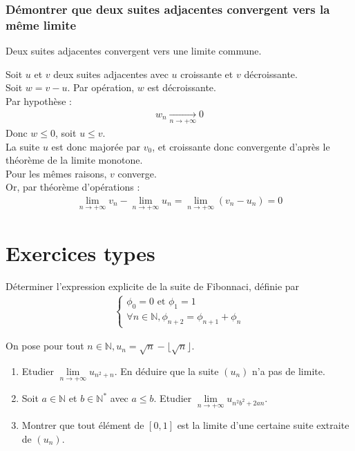 \documentclass[titlepage, twoside]{report}
\begin{document}
\subsubsection{Démontrer que deux suites adjacentes convergent vers la même limite}
\begin{tcolorbox}[title=Théorème 14.55, title filled=false, colframe=orange, colback=orange!10!white]
    Deux suites adjacentes convergent vers une limite commune. 
\end{tcolorbox}

Soit $u$ et $v$ deux suites adjacentes avec $u$ croissante et $v$ décroissante. \\
Soit $w = v - u$. Par opération, $w$ est décroissante. \\
Par hypothèse : 
\begin{align*}
    w_n \underset{n \to +\infty}{\longrightarrow} 0
\end{align*}
Donc $w \leq 0$, soit $u \leq v$. \\
La suite $u$ est donc majorée par $v_0$, et croissante donc convergente d'après le théorème de la limite monotone. \\
Pour les mêmes raisons, $v$ converge. \\
Or, par théorème d'opérations : 
\begin{align*}
    \lim_{n\to +\infty} v_n - \lim_{n\to +\infty} u_n = \lim_{n\to +\infty} (v_n - u_n) = 0
\end{align*}

\section{Exercices types}
\begin{tcolorbox}[title=Exercice 1, title filled=false, colframe=darkgreen, colback=darkgreen!10!white]
    Déterminer l'expression explicite de la suite de Fibonnaci, définie par
    \begin{align*}
        \begin{cases}
            \phi_0 = 0 \text{ et } \phi_1 = 1 \\
            \forall n \in \mathbb{N}, \phi_{n+2} = \phi_{n+1} + \phi_n
        \end{cases}
    \end{align*}
\end{tcolorbox}

\begin{tcolorbox}[title=Exercice 2, title filled=false, colframe=darkgreen, colback=darkgreen!10!white]
    On pose pour tout $n \in \mathbb{N}, u_n = \sqrt{n} - \lfloor \sqrt{n} \rfloor$.
    \begin{enumerate}
        \item Etudier $\lim\limits_{n\to + \infty} u_{n^2 + n}$. En déduire que la suite $(u_n)$ n'a pas de limite. 
        \item Soit $a \in \mathbb{N}$ et $b \in \mathbb{N}^*$ avec $a \leq b$. Etudier $\lim\limits_{n\to +\infty} u_{n^2b^2 + 2an}$. 
        \item Montrer que tout élément de $[0, 1]$ est la limite d'une certaine suite extraite de $(u_n)$. 
    \end{enumerate}
\end{tcolorbox}
\end{document}
